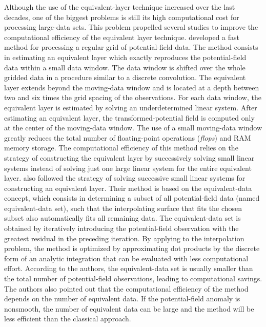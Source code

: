 Although the use of the equivalent-layer technique increased over the last decades, one of the biggest 
problems is still its high computational cost for processing large-data sets. 
This problem propelled several studies to improve the computational efficiency of the 
equivalent layer technique. 
\citet{leao-silva1989} developed a fast method for processing a regular grid of potential-field data.
The method consists in estimating an equivalent layer which exactly reproduces the potential-field data 
within a small data window. The data window is shifted over the whole gridded data in a procedure similar 
to a discrete convolution. 
The equivalent layer extends beyond the moving-data window and is located at a depth between two and six 
times the grid spacing of the observations. For each data window, the equivalent layer is estimated by 
solving an underdetermined linear system.
After estimating an equivalent layer, the transformed-potential field is computed only at the center of the 
moving-data window. The use of a small moving-data window greatly reduces the total number of floating-point 
operations (\textit{flops}) and RAM memory storage. The computational efficiency of this method relies on the 
strategy of constructing the equivalent layer by successively solving small linear systems instead of solving 
just one large linear system for the entire equivalent layer. 
\citet{mendonca-silva1994} also followed the strategy of solving successive small linear systems for 
constructing an equivalent layer. Their method is based on the  equivalent-data concept, which 
consists in determining a subset of all potential-field data (named equivalent-data set), such that the 
interpolating surface that fits the chosen subset also automatically fits all remaining data. 
The equivalent-data set is obtained by iteratively introducing the potential-field observation with the 
greatest residual in the preceding iteration. By applying to the interpolation problem, the method is 
optimized by approximating dot products by the discrete form of an analytic integration that can be 
evaluated with less computational effort. According to the authors, the equivalent-data set is usually 
smaller than the total number of potential-field observations, leading to computational savings. 
The authors also pointed out that the computational efficiency of the method depends on the number of 
equivalent data. If the potential-field anomaly is nonsmooth, the number of equivalent data can be large and 
the method will be less efficient than the classical approach.

